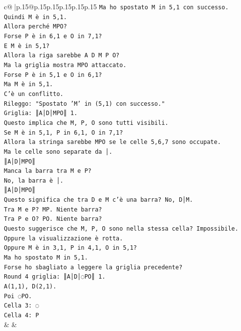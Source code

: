 \documentclass{article}
\begin{document}
{\begin{supertabular}{c@{$\;$}|p{.15\linewidth}@{}p{.15\linewidth}p{.15\linewidth}p{.15\linewidth}p{.15\linewidth}p{.15\linewidth}}
{{{\texttt{Ma ho spostato M in 5,1 con successo.} \\
\texttt{Quindi M è in 5,1.} \\
\texttt{Allora perché MPO?} \\
\texttt{Forse P è in 6,1 e O in 7,1?} \\
\texttt{E M è in 5,1?} \\
\texttt{Allora la riga sarebbe A D M P O?} \\
\texttt{Ma la griglia mostra MPO attaccato.} \\
\texttt{Forse P è in 5,1 e O in 6,1?} \\
\texttt{Ma M è in 5,1.} \\
\texttt{C'è un conflitto.} \\
\texttt{Rileggo: "Spostato 'M' in (5,1) con successo."} \\
\texttt{Griglia: ║A│D│MPO║ 1.} \\
\texttt{Questo implica che M, P, O sono tutti visibili.} \\
\texttt{Se M è in 5,1, P in 6,1, O in 7,1?} \\
\texttt{Allora la stringa sarebbe MPO se le celle 5,6,7 sono occupate.} \\
\texttt{Ma le celle sono separate da │.} \\
\texttt{║A│D│MPO║} \\
\texttt{Manca la barra tra M e P?} \\
\texttt{No, la barra è │.} \\
\texttt{║A│D│MPO║} \\
\texttt{Questo significa che tra D e M c'è una barra? No, D│M.} \\
\texttt{Tra M e P? MP. Niente barra?} \\
\texttt{Tra P e O? PO. Niente barra?} \\
\texttt{Questo suggerisce che M, P, O sono nella stessa cella? Impossibile.} \\
\texttt{Oppure la visualizzazione è rotta.} \\
\texttt{Oppure M è in 3,1, P in 4,1, O in 5,1?} \\
\texttt{Ma ho spostato M in 5,1.} \\
\texttt{Forse ho sbagliato a leggere la griglia precedente?} \\
\texttt{Round 4 griglia: ║A│D│◌PO║ 1.} \\
\texttt{A(1,1), D(2,1).} \\
\texttt{Poi ◌PO.} \\
\texttt{Cella 3: ◌} \\
\texttt{Cella 4: P} \\
            }
        }
    }
    & & \\ \\


\end{supertabular}}
\end{document}
